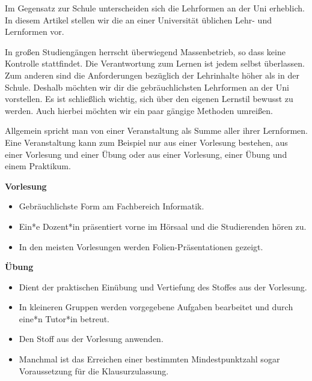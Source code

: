 
{Im Gegensatz zur Schule unterscheiden sich die Lehrformen an der Uni erheblich. In diesem Artikel stellen wir die an einer Universität üblichen Lehr- und Lernformen vor.
}{
    In großen Studiengängen herrscht über\-wiegend Massenbetrieb, so dass keine Kontrolle stattfindet. Die Verantwortung zum Lernen ist jedem selbst überlassen. Zum anderen sind die Anforderungen bezüglich der Lehrinhalte höher als in der Schule. Deshalb möchten wir dir die gebräuchlichsten Lehrformen an der Uni vorstellen. Es ist schließlich wichtig, sich über den eigenen Lernstil bewusst zu werden. Auch hierbei möchten wir ein paar gängige Methoden umreißen.

    Allgemein spricht man von einer Veranstaltung als Summe aller ihrer Lernformen. Eine Veranstaltung kann zum Beispiel nur aus einer Vorlesung bestehen, aus einer Vorlesung und einer Übung oder aus einer Vorlesung, einer Übung und einem Praktikum.
}{}

\noindent\textbf{Vorlesung}
\begin{multicols}{2}
    \begin{itemize}
        \item Gebräuchlichste Form am Fachbereich Informatik.
        \item Ein*e Dozent*in präsentiert vorne im Hörsaal und die Studierenden hören zu.
        \item In den meisten Vorlesungen werden Folien-Präsentationen gezeigt.
    \end{itemize}
\end{multicols}


\noindent\textbf{Übung}
\begin{multicols}{2}

    \columnbreak

    \begin{itemize}
        \item Dient der praktischen Einübung und Vertiefung des Stoffes aus der Vorlesung.
        \item In kleineren Gruppen werden vorgegebene Aufgaben bearbeitet und durch eine*n Tutor*in betreut.
        \item Den Stoff aus der Vorlesung anwenden.
        \item Manchmal ist das Erreichen einer bestimmten Mindestpunktzahl sogar Voraussetzung für die Klausurzulassung.
    \end{itemize}
\end{multicols}

